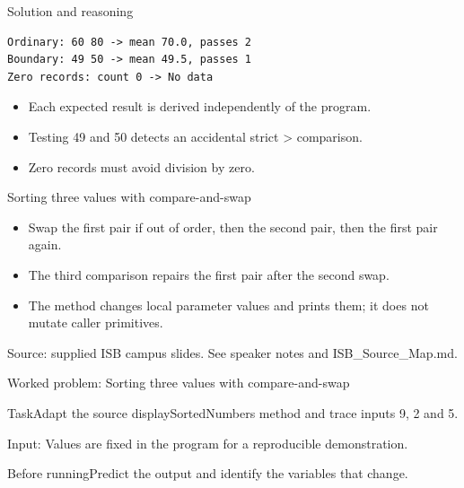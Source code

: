 \documentclass[10pt,aspectratio=169]{beamer}
\begin{document}
\begin{frame}[fragile,t]{Solution and reasoning}
\begin{lstlisting}
Ordinary: 60 80 -> mean 70.0, passes 2
Boundary: 49 50 -> mean 49.5, passes 1
Zero records: count 0 -> No data
\end{lstlisting}\vspace{1mm}\small\begin{itemize}
\item Each expected result is derived independently of the program.
\item Testing 49 and 50 detects an accidental strict \textgreater{} comparison.
\item Zero records must avoid division by zero.
\end{itemize}
\end{frame}

\begin{frame}[fragile,t]{Sorting three values with compare{-}and{-}swap}
\begin{itemize}
\item Swap the first pair if out of order, then the second pair, then the first pair again.
\item The third comparison repairs the first pair after the second swap.
\item The method changes local parameter values and prints them; it does not mutate caller primitives.
\end{itemize}
\vspace{3mm}\footnotesize\textcolor{accent}{Source: supplied ISB campus slides. See speaker notes and ISB\_Source\_Map.md.}
\end{frame}

\begin{frame}[fragile,t]{Worked problem: Sorting three values with compare{-}and{-}swap}
\begin{block}{Task}Adapt the source displaySortedNumbers method and trace inputs 9, 2 and 5.\end{block}
\small Input: Values are fixed in the program for a reproducible demonstration.\par\vspace{3mm}\begin{exampleblock}{Before running}Predict the output and identify the variables that change.\end{exampleblock}
\end{frame}
\end{document}

